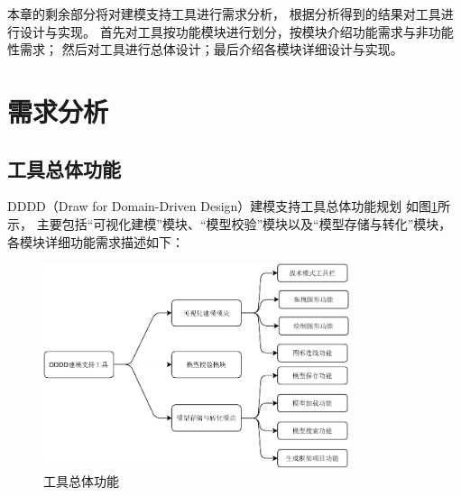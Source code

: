 本章的剩余部分将对建模支持工具进行需求分析，
根据分析得到的结果对工具进行设计与实现。
首先对工具按功能模块进行划分，按模块介绍功能需求与非功能性需求；
然后对工具进行总体设计；最后介绍各模块详细设计与实现。


\section{需求分析}

\subsection{工具总体功能}

DDDD（Draw for Domain-Driven Design）建模支持工具总体功能规划
如图\ref{toolstotal}所示，
主要包括“可视化建模”模块、“模型校验”模块以及“模型存储与转化”模块，
各模块详细功能需求描述如下：

\begin{figure}[!htbp] %
    \centering %
    \includegraphics[width=0.8\textwidth]{FIGs/chapter4/toolstotal.pdf} %
    \caption{工具总体功能} %
    \label{toolstotal} %
\end{figure}%



